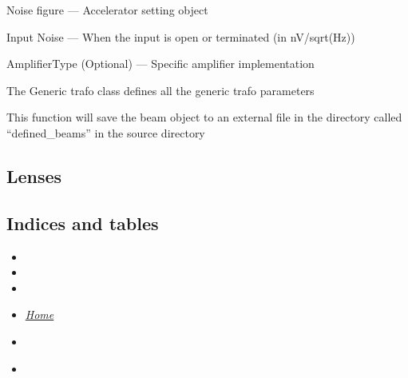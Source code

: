 \documentclass[letterpaper,10pt,english]{sphinxmanual}
\begin{document}
Noise figure --- Accelerator setting object

Input Noise --- When the input is open or terminated (in nV/sqrt(Hz))

AmplifierType (Optional) --- Specific amplifier implementation

\begin{fulllineitems}
\label{common_modules:AmpAttModule.genericAmpAtt}
The Generic trafo class defines all the generic trafo parameters

\begin{fulllineitems}
\label{common_modules:AmpAttModule.genericAmpAtt.save}
This function will save the beam object to an external file in the directory called ``defined\_beams'' in the source directory

\end{fulllineitems}


\end{fulllineitems}



\subsection{Lenses}
\label{common_modules:lenses}

\subsection{Indices and tables}
\label{common_modules:indices-and-tables}\begin{itemize}
\item {} 

\item {} 

\item {} 

\item {} 
{\hyperref[index::doc]{\emph{\emph{Home}}}}

\item {} 
{\hyperref[index:index-label]{\emph{}}}

\item {} 
{\hyperref[beam:beam-label]{\emph{}}}

\end{itemize}
\end{document}
